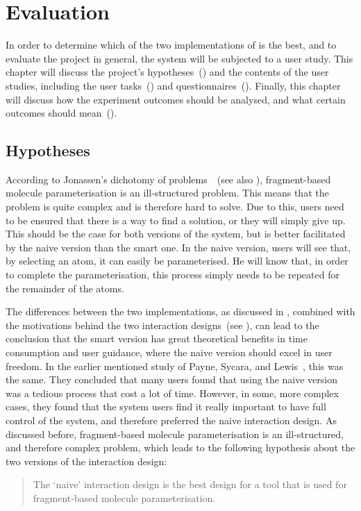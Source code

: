 \chapter{Evaluation}

In order to determine which of the two implementations of \oframp{} is the best, and to evaluate the project in general, the system will be subjected to a user study. This chapter will discuss the project's hypotheses~() and the contents of the user studies, including the user tasks~() and questionnaires~(). Finally, this chapter will discuss how the experiment outcomes should be analysed, and what certain outcomes should mean~().


\section{Hypotheses}
According to Jonassen's dichotomy of problems~\cite{jonassen2000toward}~(see also ), fragment-based molecule parameterisation is an ill-structured problem. This means that the problem is quite complex and is therefore hard to solve. Due to this, users need to be ensured that there is a way to find a solution, or they will simply give up. This should be the case for both versions of the system, but is better facilitated by the naive version than the smart one. In the naive version, users will see that, by selecting an atom, it can easily be parameterised. He will know that, in order to complete the parameterisation, this process simply needs to be repeated for the remainder of the atoms.

The differences between the two implementations, as discussed in , combined with the motivations behind the two interaction designs~(see ), can lead to the conclusion that the smart version has great theoretical benefits in time consumption and user guidance, where the naive version should excel in user freedom. In the earlier mentioned study of Payne, Sycara, and Lewis~\cite{payne2000varying}, this was the same. They concluded that many users found that using the naive version was a tedious process that cost a lot of time. However, in some, more complex cases, they found that the system users find it really important to have full control of the system, and therefore preferred the naive interaction design. As discussed before, fragment-based molecule parameterisation is an ill-structured, and therefore complex problem, which leads to the following hypothesis about the two versions of the interaction design:
\begin{quote}
The `naive' interaction design is the best design for a tool that is used for fragment-based molecule parameterisation.
\end{quote}

